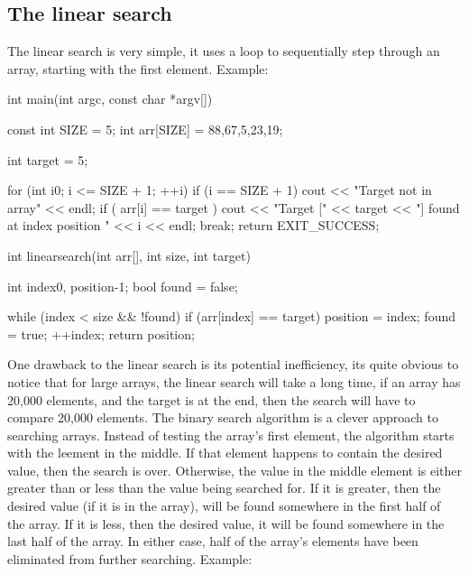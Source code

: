 \documentclass{report}
\begin{document}
    \pagebreak 
        \subsection{The linear search}
    \bigbreak \noindent 
    The linear search is very simple, it uses a loop to sequentially step through an array, starting with the first element.
    \bigbreak \noindent 
    Example:
    \bigbreak \noindent 
    
    \begin{cppcode}
int main(int argc, const char *argv[]) {

    const int SIZE = 5;
    int arr[SIZE] = {88,67,5,23,19};

    int target = 5;

    for (int i{0}; i <= SIZE + 1; ++i) {
        if (i == SIZE + 1) {
            cout << "Target not in array" << endl;
        }
        if ( arr[i] == target ) {
            cout << "Target [" << target << "] found at index position " << i << endl;
            break;
        }
    }
    return EXIT_SUCCESS;
}
    \end{cppcode}
    
    \bigbreak \noindent 
    
    \begin{cppcode}
int linearsearch(int arr[], int size, int target) {
    int index{0}, position{-1};
    bool found = false;

    while (index < size && !found) {
        if (arr[index] == target) {
            position = index;
            found = true;
        }
        ++index;
    }
    return position;
}
    \end{cppcode}
    
    \bigbreak \noindent 
    \pagebreak
    One drawback to the linear search is its potential inefficiency, its quite obvious to notice that for large arrays, the linear search will take a long time, if an array has 20,000 elements, and the target is at the end, then the search will have to compare 20,000 elements.
    \pagebreak 
    \bigbreak \noindent 
    The binary search algorithm is a clever approach to searching arrays. Instead of testing the array's first element, the algorithm starts with the leement in the middle. If that element happens to contain the desired value, then the search is over. Otherwise, the value in the middle element is either greater than or less than the value being searched for. If it is greater, then the desired value (if it is in the array), will be found somewhere in the first half of the array. If it is less, then the desired value, it will be found somewhere in the last half of the array. In either case, half of the array's elements have been eliminated from further searching.
    \bigbreak \noindent 
    \bigbreak \noindent 
    Example:
    \bigbreak \noindent 
    
\end{document}
